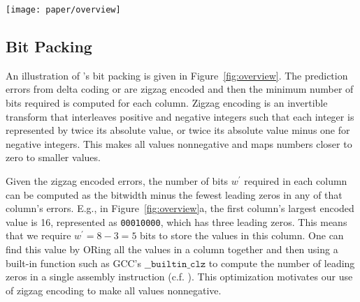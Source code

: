 \begin{figure*}[t]
\begin{center}
    \texttt{[image: paper/overview]}
    \caption{Overview of \minesp using a delta coding predictor.\textit{ a)} Delta coding of each column, followed by zigzag encoding of resulting errors. The maximum number of significant (nonzero) bits is computed for each column. \textit{b)} These numbers of bits are stored in a header, and the original data is stored as a (byte-aligned) payload, with leading zeros removed. When there are few columns, each column's data is stored contiguously. When there are many columns, each row is stored contiguously, possibly with padding to ensure alignment on a byte boundary.}
    \label{fig:overview}
\end{center}
\end{figure*}

\subsection{Bit Packing} \label{sec:bitpacking}

An illustration of \mine's bit packing is given in Figure~\ref{fig:overview}. The prediction errors from delta coding or \fire are zigzag encoded \cite{zigzag} and then the minimum number of bits required is computed for each column. Zigzag encoding is an invertible transform that interleaves positive and negative integers such that each integer is represented by twice its absolute value, or twice its absolute value minus one for negative integers. This makes all values nonnegative and maps numbers closer to zero to smaller values.

Given the zigzag encoded errors, the number of bits $w^\prime$ required in each column can be computed as the bitwidth minus the fewest leading zeros in any of that column's errors. E.g., in Figure~\ref{fig:overview}a, the first column's largest encoded value is 16, represented as \texttt{00010000}, which has three leading zeros. This means that we require $w^\prime = 8 - 3 = 5$ bits to store the values in this column. One can find this value by ORing all the values in a column together and then using a built-in function such as GCC's $\texttt{\_\_builtin\_clz}$ to compute the number of leading zeros in a single assembly instruction (c.f. \cite{fastpfor}). This optimization motivates our use of zigzag encoding to make all values nonnegative.

